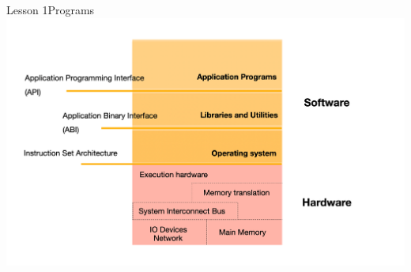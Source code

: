 \documentclass[aspectratio=1610]{beamer}
\begin{document}
\begin{frame}{Lesson 1}{Programs}
\includegraphics[scale=0.15]{Images/sfwhdw}
\end{frame}






\end{document}
